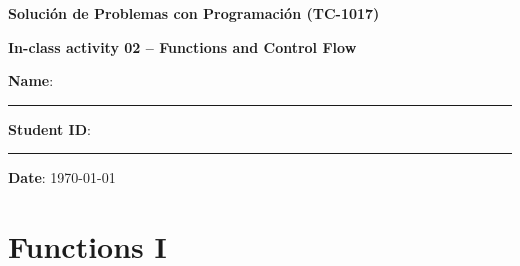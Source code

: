 \documentclass[spanish, 10pt]{article}
\begin{document}
\begin{center}
	{\Large \textbf{Solución de Problemas con Programación (TC-1017)}}
	
	\bigskip
	{\large \textbf{In-class activity 02 -- Functions and Control Flow}}
\end{center}

\bigskip
{\large \textbf{Name}: \rule{13.7 cm}{0.4mm}}



\bigskip
{\large \textbf{Student ID}: \rule{5 cm}{0.4mm}} \hfill {\large \textbf{Date}: \today}

\section{Functions I}
\end{document}
